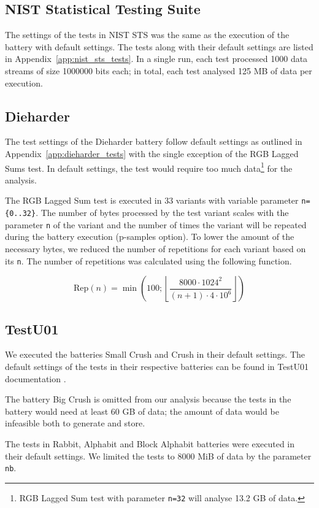 \documentclass[
	digital,    %
	oneside,
	color,
	11pt,
	nocover,
	notable,
	nolof,
	nolot,
]{fithesis3}
\theoremstyle{definition}
\theoremstyle{remark}
\begin{document}
\subsection*{NIST Statistical Testing Suite}
The settings of the tests in NIST STS was the same as the execution of the battery with default settings. The tests along with their default settings are listed in Appendix~\ref{app:nist_sts_tests}. In a single run, each test processed 1000 data streams of size 1000000 bits each; in total, each test analysed 125 MB of data per execution.

\subsection*{Dieharder}
The test settings of the Dieharder battery follow default settings as outlined in Appendix~\ref{app:dieharder_tests} with the single exception of the RGB Lagged Sums test. In default settings, the test would require too much data\footnote{RGB Lagged Sum test with parameter \texttt{n=32} will analyse 13.2 GB of data.} for the analysis. 

The RGB Lagged Sum test is executed in 33 variants with variable parameter \texttt{n=\{0..32\}}. The number of bytes processed by the test variant scales with the parameter \texttt{n} of the variant and the number of times the variant will be repeated during the battery execution (p-samples option). To lower the amount of the necessary bytes, we reduced the number of repetitions for each variant based on its \texttt{n}. The number of repetitions was calculated using the following function.

$$
\text{Rep}(n) = \min\left(100 ; \left\lfloor \frac{ 8000 \cdot 1024^{2} }{ (n + 1) \cdot 4 \cdot 10^{6} } \right\rfloor \right)
$$

\subsection*{TestU01}
We executed the batteries Small Crush and Crush in their default settings. The default settings of the tests in their respective batteries can be found in TestU01 documentation \cite[p.~143]{testu01-documentation}.

The battery Big Crush is omitted from our analysis because the tests in the battery would need at least 60 GB of data; the amount of data would be infeasible both to generate and store.

The tests in Rabbit, Alphabit and Block Alphabit batteries were executed in their default settings. We limited the tests to 8000 MiB of data by the parameter \texttt{nb}.
\end{document}
